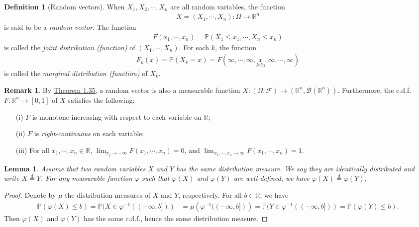 \documentclass{article}
\numberwithin{equation}{section}
\renewcommand{\d}{\mathrm{d}}
\theoremstyle{plain}
\newtheorem{lemma}[theorem]{Lemma}
\theoremstyle{definition}
\newtheorem{definition}[theorem]{Definition}
\newtheorem*{remark}{Remark}
\begin{document}
\begin{definition}[Random vectors]\label{def:2.6} When $X_1,X_2,\cdots,X_n$ are all random variables, the function
\begin{align*}
	X=(X_1,\cdots,X_n):\Omega\to\mathbb{R}^n
\end{align*}
is said to be a \textit{random vector}. The function
\begin{align*}
	F(x_1,\cdots,x_n)=\mathbb{P}(X_1\leq x_1,\cdots,X_n\leq x_n)
\end{align*}
is called the \textit{joint distribution (function)} of $(X_1,\cdots,X_n)$. For each $k$, the function
\begin{align*}
	F_k(x)=\mathbb{P}(X_k=x) = F(\infty,\cdots,\infty,\underset{k\textit{-th}}{x},\infty,\cdots,\infty)
\end{align*}
is called the \textit{marginal distribution (function)} of $X_k$.
\end{definition}
\begin{remark} By \hyperref[thm:1.35]{Theorem 1.35}, a random vector is also a measurable function $X:(\Omega,\mathscr{F})\to(\mathbb{R}^n,\mathscr{B}(\mathbb{R}^n))$. Furthermore, the c.d.f. $F:\mathbb{R}^n\to[0,1]$ of $X$ satisfies the following:
\begin{itemize}
	\item[(i)] $F$ is monotone increasing with respect to each variable on $\mathbb{R}$;
	\item[(ii)] $F$ is \textit{right-continuous} on each variable;
	\item[(iii)] For all $x_1,\cdots,x_n\in\mathbb{R}$, $\lim_{x_j\to-\infty}F(x_1,\cdots,x_n)=0$, and $\lim_{x_1,\cdots,x_n\to\infty} F(x_1,\cdots,x_n)=1$.
\end{itemize}
\end{remark}
\begin{lemma}\label{lemma:2.7} Assume that two random variables $X$ and $Y$ has the same distribution measure. We say they are \textit{identically distributed} and write $X\overset{\d}{=}Y$. For any measurable function $\varphi$ such that $\varphi(X)$ and $\varphi(Y)$ are well-defined, we have $\varphi(X)\overset{\d}{=}\varphi(Y)$.
\end{lemma}
\begin{proof}
Denote by $\mu$ the distribution measures of $X$ and $Y$, respectively. For all $b\in\mathbb{R}$, we have
\begin{align*}
	\mathbb{P}(\varphi(X)\leq b) = \mathbb{P}(X\in\varphi^{-1}((-\infty,b])) &= \mu\left(\varphi^{-1}((-\infty,b])\right) = \mathbb{P}(Y\in\varphi^{-1}((-\infty,b])) = \mathbb{P}(\varphi(Y)\leq b).
\end{align*}
Then $\varphi(X)$ and $\varphi(Y)$ has the same c.d.f., hence the same distribution measure.
\end{proof}
\end{document}
